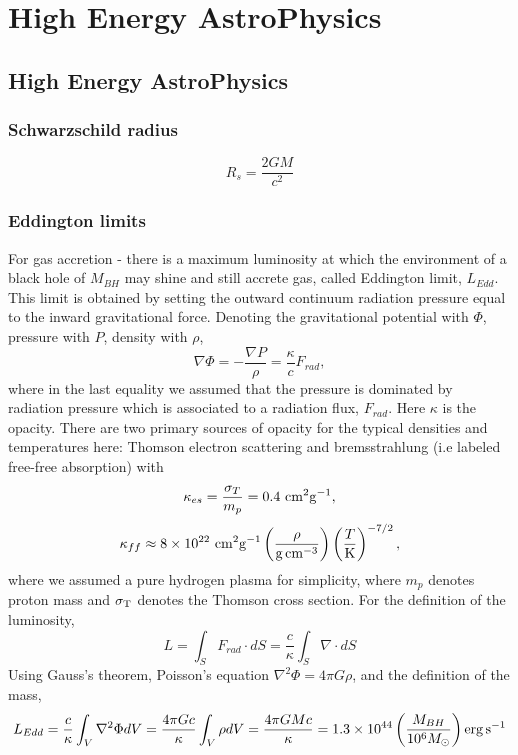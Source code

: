 \chapter{High Energy AstroPhysics}

\section{High Energy AstroPhysics}

\subsection{Schwarzschild radius}
\begin{equation}
   R_{s} = \frac{2GM}{c^{2}} 
\end{equation}

\bigskip
\subsection{Eddington limits}

For gas accretion - there is a maximum luminosity at which the environment of a black hole
of $M_{BH}$ may shine and still accrete gas, called Eddington limit, $L_{Edd}$.
This limit is obtained by setting the outward continuum radiation pressure equal to the inward
gravitational force. Denoting the gravitational potential with $\Phi$, pressure with $P$, density 
with $\rho$,
\begin{equation}
   \nabla\Phi = -\frac{\nabla P}{\rho}=\frac{\kappa}{c}F_{rad},
\end{equation}
where in the last equality we assumed that the pressure is dominated by radiation pressure
which is associated to a radiation flux, $F_{rad}$. Here $\kappa$ is the opacity. There are two
primary sources of opacity for the typical densities and temperatures here:
Thomson electron scattering and bremsstrahlung (i.e labeled free-free absorption) with
\begin{equation}
    \kappa_{es}=\frac{\sigma_{T}}{m_{p}} = 0.4 ~ {\rm cm^{2}g^{-1}},
\end{equation}
\begin{equation}
    \kappa_{ff}\approx 8\times10^{22} ~{\rm cm^{2}g^{-1}} \left(\frac{\rho}{{\rm g\,cm^{-3}}}\right) \left( \frac{T}{{\rm K}} \right)^{-7/2},
\end{equation}
where we assumed a pure hydrogen plasma for simplicity, where $m_{p}$ denotes proton mass and $\sigma_{\rm T}$ denotes the 
Thomson cross section. For the definition of the luminosity,
\begin{equation} 
   L = \int_{S} F_{rad}\cdot dS = \frac{c}{\kappa} \int_{S} \nabla\cdot dS
\end{equation}
Using Gauss's theorem,  Poisson's equation $\nabla^{2}\Phi=4\pi G \rho$, and the definition of the mass,
\begin{equation}
   L_{Edd} = \frac{c}{\kappa}\int_{V}\nabla^{2}\Phi dV = \frac{4\pi G c}{\kappa}\int_{V}\rho dV=\frac{4\pi G M c}{\kappa} 
           = 1.3\times10^{44} \left( \frac{M_{BH}}{10^{6} M_{\odot}} \right) {\rm erg\,s^{-1}}
\end{equation}

